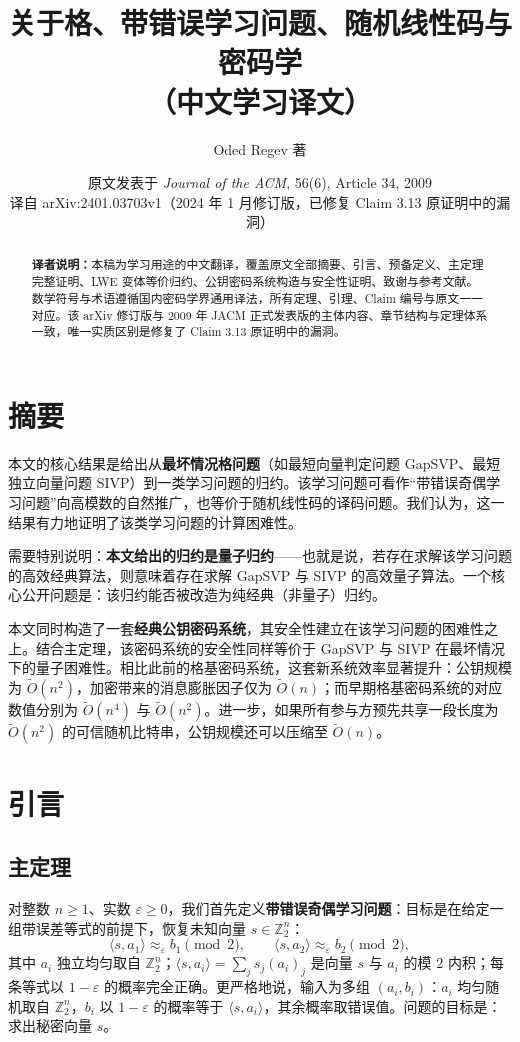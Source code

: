\documentclass[11pt,a4paper]{article}
\title{关于格、带错误学习问题、随机线性码与密码学\\（中文学习译文）}
\author{Oded Regev 著}
\date{原文发表于 \textit{Journal of the ACM}, 56(6), Article 34, 2009\\
译自 arXiv:2401.03703v1（2024 年 1 月修订版，已修复 Claim 3.13 原证明中的漏洞）}
\newcommand{\Z}{\mathbb{Z}}
\begin{document}
\maketitle

\begin{abstract}
\noindent\textbf{译者说明：}本稿为学习用途的中文翻译，覆盖原文全部摘要、引言、预备定义、主定理完整证明、LWE 变体等价归约、公钥密码系统构造与安全性证明、致谢与参考文献。数学符号与术语遵循国内密码学界通用译法，所有定理、引理、Claim 编号与原文一一对应。该 arXiv 修订版与 2009 年 JACM 正式发表版的主体内容、章节结构与定理体系一致，唯一实质区别是修复了 Claim 3.13 原证明中的漏洞。
\end{abstract}

\section*{摘要}

本文的核心结果是给出从\textbf{最坏情况格问题}（如最短向量判定问题 GapSVP、最短独立向量问题 SIVP）到一类学习问题的归约。该学习问题可看作``带错误奇偶学习问题''向高模数的自然推广，也等价于随机线性码的译码问题。我们认为，这一结果有力地证明了该类学习问题的计算困难性。

需要特别说明：\textbf{本文给出的归约是量子归约}——也就是说，若存在求解该学习问题的高效经典算法，则意味着存在求解 GapSVP 与 SIVP 的高效量子算法。一个核心公开问题是：该归约能否被改造为纯经典（非量子）归约。

本文同时构造了一套\textbf{经典公钥密码系统}，其安全性建立在该学习问题的困难性之上。结合主定理，该密码系统的安全性同样等价于 GapSVP 与 SIVP 在最坏情况下的量子困难性。相比此前的格基密码系统，这套新系统效率显著提升：公钥规模为 $\widetilde{O}(n^{2})$，加密带来的消息膨胀因子仅为 $\widetilde{O}(n)$；而早期格基密码系统的对应数值分别为 $\widetilde{O}(n^{4})$ 与 $\widetilde{O}(n^{2})$。进一步，如果所有参与方预先共享一段长度为 $\widetilde{O}(n^{2})$ 的可信随机比特串，公钥规模还可以压缩至 $\widetilde{O}(n)$。

\section{引言}

\subsection{主定理}

对整数 $n\ge 1$、实数 $\varepsilon\ge 0$，我们首先定义\textbf{带错误奇偶学习问题}：目标是在给定一组带误差等式的前提下，恢复未知向量 $s\in\Z_{2}^{n}$：
\[
  \langle s,a_{1}\rangle \approx_{\varepsilon} b_{1} \pmod{2},
  \qquad
  \langle s,a_{2}\rangle \approx_{\varepsilon} b_{2} \pmod{2},
\]
其中 $a_{i}$ 独立均匀取自 $\Z_{2}^{n}$；$\langle s,a_{i}\rangle=\sum_{j}s_{j}(a_{i})_{j}$ 是向量 $s$ 与 $a_{i}$ 的模 $2$ 内积；每条等式以 $1-\varepsilon$ 的概率完全正确。更严格地说，输入为多组 $(a_{i},b_{i})$：$a_{i}$ 均匀随机取自 $\Z_{2}^{n}$，$b_{i}$ 以 $1-\varepsilon$ 的概率等于 $\langle s,a_{i}\rangle$，其余概率取错误值。问题的目标是：求出秘密向量 $s$。
\end{document}
